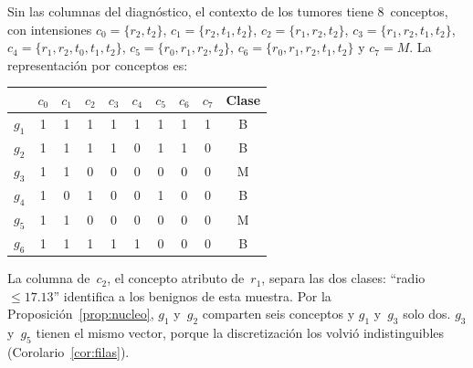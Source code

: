 \begin{ejemplo}\label{ej:caracteristicas}
Sin las columnas del diagnóstico, el contexto de los tumores tiene 8~conceptos, con intensiones $c_0 = \{r_2, t_2\}$, $c_1 = \{r_2, t_1, t_2\}$, $c_2 = \{r_1, r_2, t_2\}$, $c_3 = \{r_1, r_2, t_1, t_2\}$, $c_4 = \{r_1, r_2, t_0, t_1, t_2\}$, $c_5 = \{r_0, r_1, r_2, t_2\}$, $c_6 = \{r_0, r_1, r_2, t_1, t_2\}$ y $c_7 = M$. La representación por conceptos es:
\begin{center}
\small
\begin{tabular}{c|cccccccc|c}
  & $c_0$ & $c_1$ & $c_2$ & $c_3$ & $c_4$ & $c_5$ & $c_6$ & $c_7$ & Clase \\ \hline
  $g_1$ & 1 & 1 & 1 & 1 & 1 & 1 & 1 & 1 & B \\
  $g_2$ & 1 & 1 & 1 & 1 & 0 & 1 & 1 & 0 & B \\
  $g_3$ & 1 & 1 & 0 & 0 & 0 & 0 & 0 & 0 & M \\
  $g_4$ & 1 & 0 & 1 & 0 & 0 & 1 & 0 & 0 & B \\
  $g_5$ & 1 & 1 & 0 & 0 & 0 & 0 & 0 & 0 & M \\
  $g_6$ & 1 & 1 & 1 & 1 & 1 & 0 & 0 & 0 & B
\end{tabular}
\end{center}
La columna de~$c_2$, el concepto atributo de~$r_1$, separa las dos clases: \enquote{radio${}\le 17.13$} identifica a los benignos de esta muestra. Por la Proposición~\ref{prop:nucleo}, $g_1$ y~$g_2$ comparten seis conceptos y $g_1$ y~$g_3$ solo dos. $g_3$ y~$g_5$ tienen el mismo vector, porque la discretización los volvió indistinguibles (Corolario~\ref{cor:filas}).
\end{ejemplo}
